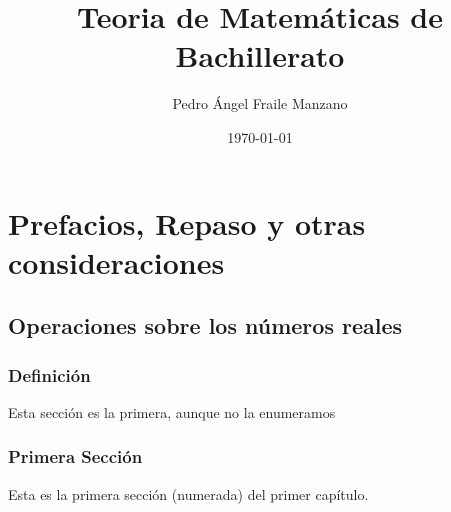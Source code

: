\documentclass[12pt,a4paper]{book}
\title{Teoria de Matemáticas de Bachillerato}
\author{Pedro Ángel Fraile Manzano}
\date{\today}
\begin{document}


\maketitle%




\dominitoc%

\renewcommand{\contentsname}{Contenidos Generales}%

\tableofcontents

\part{Prefacios, Repaso y otras consideraciones}



\chapter{Operaciones sobre los números reales}

\minitoc

 
\section*{Definición} 


Esta secci\'on es la primera, aunque no la enumeramos
 
\section{Primera Secci\'on}
Esta es la primera secci\'on (numerada) del primer cap\'itulo.
\end{document}

